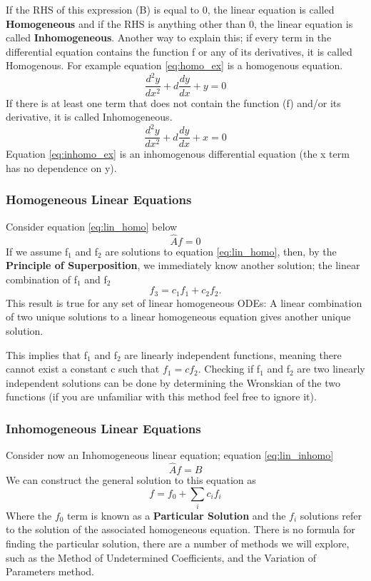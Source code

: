 \documentclass{article}
\newcommand{\be}{\begin{equation}}
\newcommand{\ee}{\end{equation}}
\begin{document}
If the RHS of this expression (B) is equal to 0, the linear equation is called \textbf{Homogeneous} and if the RHS is anything other than 0, the linear equation is called \textbf{Inhomogeneous}.
Another way to explain this; if every term in the differential equation contains the function f or any of its derivatives, it is called Homogenous.
For example equation \ref{eq:homo_ex} is a homogenous equation.
\be \label{eq:homo_ex}
\frac{d^2y}{dx^2} + d\frac{dy}{dx} + y = 0
\ee
If there is at least one term that does not contain the function (f) and/or its derivative, it is called Inhomogeneous.
\be \label{eq:inhomo_ex}
\frac{d^2y}{dx^2} + d\frac{dy}{dx} + x = 0
\ee
Equation \ref{eq:inhomo_ex} is an inhomogenous differential equation (the x term has no dependence on y).

\subsubsection*{Homogeneous Linear Equations}
Consider equation \ref{eq:lin_homo} below
\be \label{eq:lin_homo}
\hat{A}f = 0
\ee
If we assume f$_1$ and f$_2$ are solutions to equation \ref{eq:lin_homo}, then, by the \textbf{Principle of Superposition}, we immediately know another solution; the linear combination of f$_1$ and f$_2$
\be
f_3 = c_1f_1 + c_2f_2 .
\ee
This result is true for any set of linear homogeneous ODEs: A linear combination of two unique solutions to a linear homogeneous equation gives another unique solution.

This implies that f$_1$ and f$_2$ are linearly independent functions, meaning there cannot exist a constant c such that $f_1 = cf_2$.
Checking if f$_1$ and f$_2$ are two linearly independent solutions can be done by determining the Wronskian of the two functions (if you are unfamiliar with this method feel free to ignore it).

\subsubsection*{Inhomogeneous Linear Equations}
Consider now an Inhomogeneous linear equation; equation \ref{eq:lin_inhomo}
\be \label{eq:lin_inhomo}
\hat{A}f = B
\ee
We can construct the general solution to this equation as
\be
f = f_0 + \sum_i c_i f_i
\ee
Where the $f_0$ term is known as a \textbf{Particular Solution} and the $f_i$ solutions refer to the solution of the associated homogeneous equation.
There is no formula for finding the particular solution, there are a number of methods we will explore, such as the Method of Undetermined Coefficients, and the Variation of Parameters method.
\end{document}
